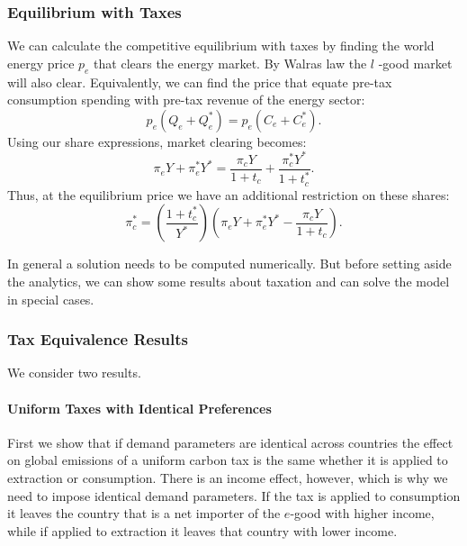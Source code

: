 \documentclass[notitlepage,12pt]{article}
\begin{document}
\subsubsection{Equilibrium with Taxes}

We can calculate the competitive equilibrium with taxes by finding the world
energy price $p_{e}$ that clears the energy market. By Walras law the $l$%
-good market will also clear. Equivalently, we can find the price that
equate pre-tax consumption spending with pre-tax revenue of the energy
sector:%
\begin{equation}
p_{e}\left( Q_{e}+Q_{e}^{\ast }\right) =p_{e}\left( C_{e}+C_{e}^{\ast
}\right) .  \label{market clearing}
\end{equation}%
Using our share expressions, market clearing becomes:%
\begin{equation*}
\pi _{e}Y+\pi _{e}^{\ast }Y^{\ast }=\frac{\pi _{c}Y}{1+t_{c}}+\frac{\pi
_{c}^{\ast }Y^{\ast }}{1+t_{c}^{\ast }}.
\end{equation*}%
Thus, at the equilibrium price we have an additional restriction on these
shares:%
\begin{equation*}
\pi _{c}^{\ast }=\left( \frac{1+t_{c}^{\ast }}{Y^{\ast }}\right) \left( \pi
_{e}Y+\pi _{e}^{\ast }Y^{\ast }-\frac{\pi _{c}Y}{1+t_{c}}\right) .
\end{equation*}

In general a solution needs to be computed numerically. But before setting
aside the analytics, we can show some results about taxation and can solve
the model in special cases.

\subsubsection{Tax Equivalence Results}

We consider two results.

\paragraph{Uniform Taxes with Identical Preferences}

First we show that if demand parameters are identical across countries the
effect on global emissions of a uniform carbon tax is the same whether it is
applied to extraction or consumption. There is an income effect, however,
which is why we need to impose identical demand parameters. If the tax is
applied to consumption it leaves the country that is a net importer of the $%
e $-good with higher income, while if applied to extraction it leaves that
country with lower income.
\end{document}
